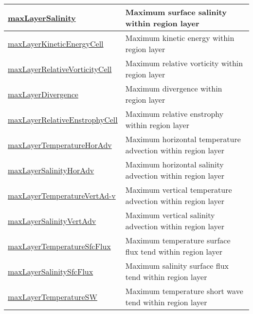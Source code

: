 {\begin{center}
\begin{longtable}{| p{2.0in} | p{4.0in} |}
    \hline
    \hyperref[subsec:var_sec_layerVolumeWeightedAverageAM_maxLayerSalinity]{maxLayerSalinity} & Maximum surface salinity within region layer \\
    \hline
    \hyperref[subsec:var_sec_layerVolumeWeightedAverageAM_maxLayerKineticEnergyCell]{maxLayerKineticEnergyCell} & Maximum kinetic energy within region layer \\
    \hline
    \hyperref[subsec:var_sec_layerVolumeWeightedAverageAM_maxLayerRelativeVorticityCell]{maxLayerRelativeVorticityCell} & Maximum relative vorticity within region layer \\
    \hline
    \hyperref[subsec:var_sec_layerVolumeWeightedAverageAM_maxLayerDivergence]{maxLayerDivergence} & Maximum divergence within region layer \\
    \hline
    \hyperref[subsec:var_sec_layerVolumeWeightedAverageAM_maxLayerRelativeEnstrophyCell]{maxLayerRelativeEnstrophyCell} & Maximum relative enstrophy within region layer \\
    \hline
    \hyperref[subsec:var_sec_layerVolumeWeightedAverageAM_maxLayerTemperatureHorAdv]{maxLayerTemperatureHorAdv} & Maximum horizontal temperature advection within region layer \\
    \hline
    \hyperref[subsec:var_sec_layerVolumeWeightedAverageAM_maxLayerSalinityHorAdv]{maxLayerSalinityHorAdv} & Maximum horizontal salinity advection within region layer \\
    \hline
    \hyperref[subsec:var_sec_layerVolumeWeightedAverageAM_maxLayerTemperatureVertAdv]{maxLayerTemperatureVertAd-}\hyperref[subsec:var_sec_layerVolumeWeightedAverageAM_maxLayerTemperatureVertAdv]{v}  & Maximum vertical temperature advection within region layer \\
    \hline
    \hyperref[subsec:var_sec_layerVolumeWeightedAverageAM_maxLayerSalinityVertAdv]{maxLayerSalinityVertAdv} & Maximum vertical salinity advection within region layer \\
    \hline
    \hyperref[subsec:var_sec_layerVolumeWeightedAverageAM_maxLayerTemperatureSfcFlux]{maxLayerTemperatureSfcFlux} & Maximum temperature surface flux tend within region layer \\
    \hline
    \hyperref[subsec:var_sec_layerVolumeWeightedAverageAM_maxLayerSalinitySfcFlux]{maxLayerSalinitySfcFlux} & Maximum salinity surface flux tend within region layer \\
    \hline
    \hyperref[subsec:var_sec_layerVolumeWeightedAverageAM_maxLayerTemperatureSW]{maxLayerTemperatureSW} & Maximum temperature short wave tend within region layer \\

\end{longtable}
\end{center}}
